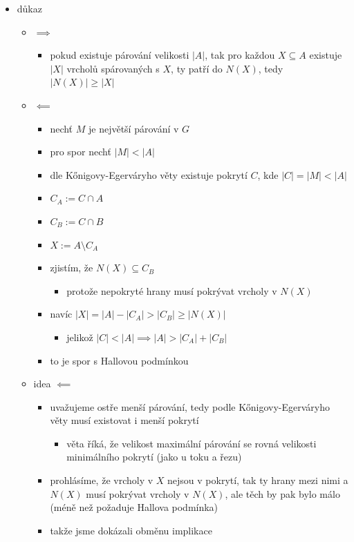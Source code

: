 \begin{itemize}
\begin{itemize}
\begin{itemize}
\end{itemize}
\item důkaz
\begin{itemize}
\item $\implies$
\begin{itemize}
\item pokud existuje párování velikosti $|A|$, tak pro každou $X\subseteq A$ existuje $|X|$ vrcholů spárovaných s $X$, ty patří do $N(X)$, tedy $|N(X)|\geq |X|$
\end{itemize}
\item $\impliedby$
\begin{itemize}
\item nechť $M$ je největší párování v $G$
\item pro spor nechť $|M|\lt|A|$
\item dle K\H{o}nigovy-Egerváryho věty existuje pokrytí $C$, kde $|C|=|M|\lt |A|$
\item $C_A:= C\cap A$
\item $C_B:=C\cap B$
\item $X:=A\setminus C_A$
\item zjistím, že $N(X)\subseteq C_B$
\begin{itemize}
\item protože nepokryté hrany musí pokrývat vrcholy v $N(X)$
\end{itemize}
\item navíc $|X|=|A|-|C_A|\gt |C_B|\geq |N(X)|$
\begin{itemize}
\item jelikož $|C|\lt|A|\implies |A|\gt|C_A|+|C_B|$
\end{itemize}
\item to je spor s Hallovou podmínkou
\end{itemize}
\item idea $\impliedby$
\begin{itemize}
\item uvažujeme ostře menší párování, tedy podle K\H{o}nigovy-Egerváryho věty musí existovat i menší pokrytí
\begin{itemize}
\item věta říká, že velikost maximální párování se rovná velikosti minimálního pokrytí (jako u toku a řezu)
\end{itemize}
\item prohlásíme, že vrcholy v $X$ nejsou v pokrytí, tak ty hrany mezi nimi a $N(X)$ musí pokrývat vrcholy v $N(X)$, ale těch by pak bylo málo (méně než požaduje Hallova podmínka)
\item takže jsme dokázali obměnu implikace

\end{itemize}
\end{itemize}
\end{itemize}
\end{itemize}
